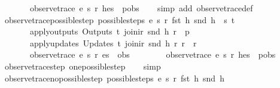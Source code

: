 \begin{isabellebody}
\ \ \ \ \ \ \ observe{\isacharunderscore}trace\ e\ s\ r\ {\isacharparenleft}h{\isacharhash}es{\isacharparenright}\ {\isacharequal}\ p{\isacharhash}obs{\isachardoublequoteclose}\isanewline
%
\isadelimproof
\ \ %
\endisadelimproof
%
\isatagproof
{}\isamarkupfalse%
\ {\isacharparenleft}simp\ add{\isacharcolon}\ observe{\isacharunderscore}trace{\isacharunderscore}def{\isacharparenright}%
\endisatagproof
{\isafoldproof}%
%
\isadelimproof
\isanewline
%
\endisadelimproof
\isanewline
{}\isamarkupfalse%
\ observe{\isacharunderscore}trace{\isacharunderscore}possible{\isacharunderscore}step{\isacharcolon}\ {\isachardoublequoteopen}possible{\isacharunderscore}steps\ e\ s\ r\ {\isacharparenleft}fst\ h{\isacharparenright}\ {\isacharparenleft}snd\ h{\isacharparenright}\ {\isacharequal}\ {\isacharbraceleft}{\isacharbar}{\isacharparenleft}s{\isacharprime}{\isacharcomma}\ t{\isacharparenright}{\isacharbar}{\isacharbraceright}\ {\isasymLongrightarrow}\isanewline
\ \ \ \ \ \ \ apply{\isacharunderscore}outputs\ {\isacharparenleft}Outputs\ t{\isacharparenright}\ {\isacharparenleft}join{\isacharunderscore}ir\ {\isacharparenleft}snd\ h{\isacharparenright}\ r{\isacharparenright}\ {\isacharequal}\ p\ {\isasymLongrightarrow}\isanewline
\ \ \ \ \ \ \ apply{\isacharunderscore}updates\ {\isacharparenleft}Updates\ t{\isacharparenright}\ {\isacharparenleft}join{\isacharunderscore}ir\ {\isacharparenleft}snd\ h{\isacharparenright}\ r{\isacharparenright}\ r\ {\isacharequal}\ r{\isacharprime}\ {\isasymLongrightarrow}\isanewline
\ \ \ \ \ \ \ observe{\isacharunderscore}trace\ e\ s{\isacharprime}\ r{\isacharprime}\ es\ {\isacharequal}\ obs\ {\isasymLongrightarrow}\isanewline
\ \ \ \ \ \ \ observe{\isacharunderscore}trace\ e\ s\ r\ {\isacharparenleft}h{\isacharhash}es{\isacharparenright}\ {\isacharequal}\ p{\isacharhash}obs{\isachardoublequoteclose}\isanewline
%
\isadelimproof
\ \ %
\endisadelimproof
%
\isatagproof
{}\isamarkupfalse%
\ observe{\isacharunderscore}trace{\isacharunderscore}step\ one{\isacharunderscore}possible{\isacharunderscore}step\isanewline
\ \ \isamarkupfalse%
\ simp%
\endisatagproof
{\isafoldproof}%
%
\isadelimproof
\isanewline
%
\endisadelimproof
\isanewline
{}\isamarkupfalse%
\ observe{\isacharunderscore}trace{\isacharunderscore}no{\isacharunderscore}possible{\isacharunderscore}step{\isacharcolon}\ {\isachardoublequoteopen}possible{\isacharunderscore}steps\ e\ s\ r\ {\isacharparenleft}fst\ h{\isacharparenright}\ {\isacharparenleft}snd\ h{\isacharparenright}\ {\isacharequal}\ {\isacharbraceleft}{\isacharbar}{\isacharbar}{\isacharbraceright}\ {\isasymLongrightarrow}\isanewline

\end{isabellebody}

